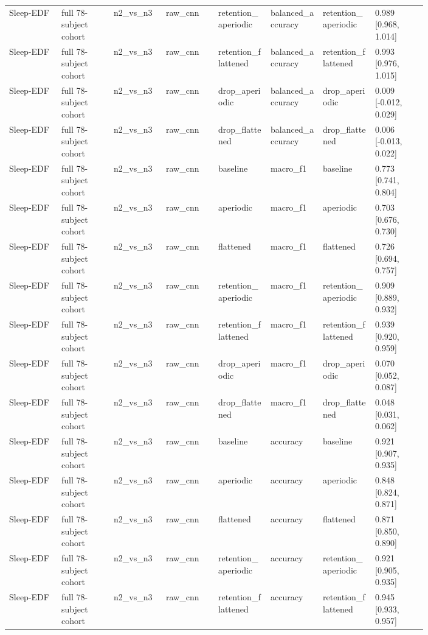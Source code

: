 \begin{longtable}{p{0.10\linewidth}p{0.10\linewidth}p{0.10\linewidth}p{0.10\linewidth}p{0.10\linewidth}p{0.10\linewidth}p{0.10\linewidth}p{0.10\linewidth}}
Sleep-EDF & full 78-subject cohort & n2\_vs\_n3 & raw\_cnn & retention\_aperiodic & balanced\_accuracy & retention\_aperiodic & 0.989 [0.968, 1.014]\\
Sleep-EDF & full 78-subject cohort & n2\_vs\_n3 & raw\_cnn & retention\_flattened & balanced\_accuracy & retention\_flattened & 0.993 [0.976, 1.015]\\
Sleep-EDF & full 78-subject cohort & n2\_vs\_n3 & raw\_cnn & drop\_aperiodic & balanced\_accuracy & drop\_aperiodic & 0.009 [-0.012, 0.029]\\
Sleep-EDF & full 78-subject cohort & n2\_vs\_n3 & raw\_cnn & drop\_flattened & balanced\_accuracy & drop\_flattened & 0.006 [-0.013, 0.022]\\
Sleep-EDF & full 78-subject cohort & n2\_vs\_n3 & raw\_cnn & baseline & macro\_f1 & baseline & 0.773 [0.741, 0.804]\\
Sleep-EDF & full 78-subject cohort & n2\_vs\_n3 & raw\_cnn & aperiodic & macro\_f1 & aperiodic & 0.703 [0.676, 0.730]\\
Sleep-EDF & full 78-subject cohort & n2\_vs\_n3 & raw\_cnn & flattened & macro\_f1 & flattened & 0.726 [0.694, 0.757]\\
Sleep-EDF & full 78-subject cohort & n2\_vs\_n3 & raw\_cnn & retention\_aperiodic & macro\_f1 & retention\_aperiodic & 0.909 [0.889, 0.932]\\
Sleep-EDF & full 78-subject cohort & n2\_vs\_n3 & raw\_cnn & retention\_flattened & macro\_f1 & retention\_flattened & 0.939 [0.920, 0.959]\\
Sleep-EDF & full 78-subject cohort & n2\_vs\_n3 & raw\_cnn & drop\_aperiodic & macro\_f1 & drop\_aperiodic & 0.070 [0.052, 0.087]\\
Sleep-EDF & full 78-subject cohort & n2\_vs\_n3 & raw\_cnn & drop\_flattened & macro\_f1 & drop\_flattened & 0.048 [0.031, 0.062]\\
Sleep-EDF & full 78-subject cohort & n2\_vs\_n3 & raw\_cnn & baseline & accuracy & baseline & 0.921 [0.907, 0.935]\\
Sleep-EDF & full 78-subject cohort & n2\_vs\_n3 & raw\_cnn & aperiodic & accuracy & aperiodic & 0.848 [0.824, 0.871]\\
Sleep-EDF & full 78-subject cohort & n2\_vs\_n3 & raw\_cnn & flattened & accuracy & flattened & 0.871 [0.850, 0.890]\\
Sleep-EDF & full 78-subject cohort & n2\_vs\_n3 & raw\_cnn & retention\_aperiodic & accuracy & retention\_aperiodic & 0.921 [0.905, 0.935]\\
Sleep-EDF & full 78-subject cohort & n2\_vs\_n3 & raw\_cnn & retention\_flattened & accuracy & retention\_flattened & 0.945 [0.933, 0.957]\\

\end{longtable}
